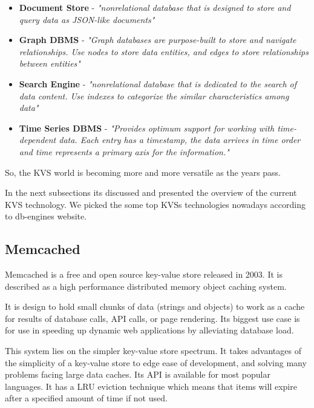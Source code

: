 \begin{itemize}
	\item \textbf{Document Store} - \textit{"nonrelational database that is designed to store and query data as JSON-like documents"} \cite{aws-nosql:1}
	\item \textbf{Graph \gls{DBMS}} - \textit{"Graph databases are purpose-built to store and navigate relationships. Use nodes to store data entities, and edges to store relationships between entities"} \cite{aws-nosql:2} 
	\item \textbf{Search Engine} - \textit{"nonrelational database that is dedicated to the search of data content. Use indexes to categorize the similar characteristics among data"} \cite{aws-nosql:3} 
	\item \textbf{Time Series \gls{DBMS}} - \textit{"Provides optimum support for working with time-dependent data. Each entry has a timestamp, the data arrives in time order and time represents a primary axis for the information."} \cite{timeSeries:1}
\end{itemize}

So, the \gls{KVS} world is becoming more and more versatile as the years pass.

In the next subsections its discussed and presented the overview of the current \gls{KVS} technology. We picked the some top KVSs technologies nowadays according to db-engines \cite{db-engine:2} website.

\subsection{Memcached} %
\label{ssec:memcached}

Memcached \cite{memcached:1} is a free and open source key-value store released in 2003. It is described as a high performance distributed memory object caching system.

It is design to hold small chunks of data (strings and objects) to work as a cache for results of database calls, API calls, or page rendering. Its biggest use case is for use in speeding up dynamic web applications by alleviating database load.

This system lies on the simpler key-value store spectrum. It takes advantages of the simplicity of a key-value store to edge ease of development, and solving many problems facing large data caches. Its API is available for most popular languages. It has a \gls{LRU} eviction technique which means that items will expire after a specified amount of time if not used. 

